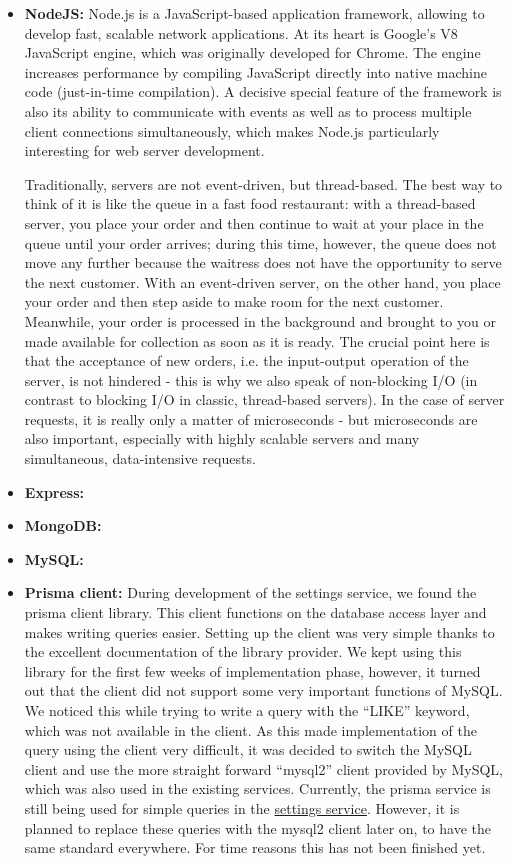 \begin{itemize}
    \item \textbf{NodeJS:} 
    Node.js is a JavaScript-based application framework, allowing to develop fast, scalable network applications. At its heart is Google's V8 JavaScript engine, which was originally developed for Chrome. The engine increases performance by compiling JavaScript directly into native machine code (just-in-time compilation).
    A decisive special feature of the framework is also its ability to communicate with events as well as to process multiple client connections simultaneously, which makes Node.js particularly interesting for web server development.
    
    Traditionally, servers are not event-driven, but thread-based. The best way to think of it is like the queue in a fast food restaurant: with a thread-based server, you place your order and then continue to wait at your place in the queue until your order arrives; during this time, however, the queue does not move any further because the waitress does not have the opportunity to serve the next customer.
    With an event-driven server, on the other hand, you place your order and then step aside to make room for the next customer. Meanwhile, your order is processed in the background and brought to you or made available for collection as soon as it is ready.
    The crucial point here is that the acceptance of new orders, i.e. the input-output operation of the server, is not hindered - this is why we also speak of non-blocking I/O (in contrast to blocking I/O in classic, thread-based servers).
    In the case of server requests, it is really only a matter of microseconds - but microseconds are also important, especially with highly scalable servers and many simultaneous, data-intensive requests.
    \item \textbf{Express:} %
    \item \textbf{MongoDB:} %
    \item \textbf{MySQL:} %
    \item \textbf{Prisma client:} During development of the settings service, we found the prisma client library.
    This client functions on the database access layer and makes writing queries easier.
    Setting up the client was very simple thanks to the excellent documentation of the library provider.
    We kept using this library for the first few weeks of implementation phase, however, it turned out that the
    client did not support some very important functions of MySQL.
    We noticed this while trying to write a query with the \enquote{LIKE} keyword, which was not available in the
    client.
    As this made implementation of the query using the client very difficult, it was decided to switch the MySQL
    client and use the more straight forward \enquote{mysql2} client provided by MySQL, which was also used in the
    existing services.
    Currently, the prisma service is still being used for simple queries in the
    \hyperref[subsubsec:settingsSer]{settings service}.
    However, it is planned to replace these queries with the mysql2 client later on, to have the same standard
    everywhere.
    For time reasons this has not been finished yet.
\end{itemize}
